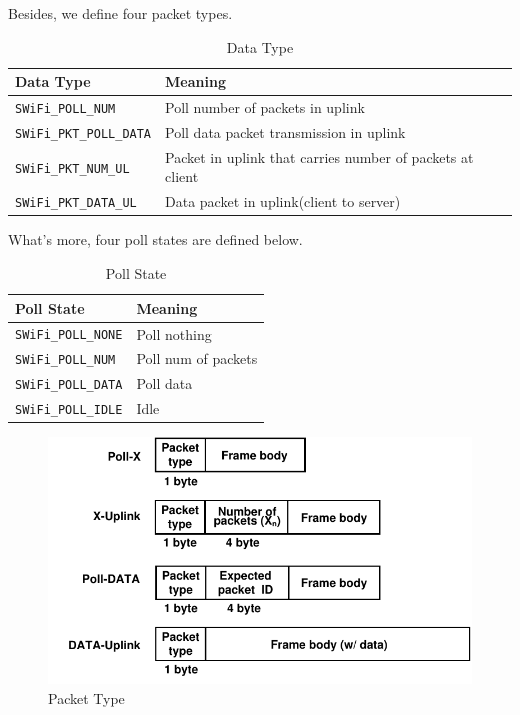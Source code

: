\documentclass{article}
\begin{document}
Besides, we define four packet types. 
\begin{table}[h!]
   \centering
   \caption{Data Type}
   \label{tab:table3}
   \begin{tabular}{| l | l |}
      \hline
      Data Type  &  Meaning\\ \hline
      \lstinline |SWiFi_POLL_NUM| & Poll number of packets in uplink\\ \hline 
      \lstinline |SWiFi_PKT_POLL_DATA|  & Poll data packet transmission in uplink\\ \hline 
      \lstinline |SWiFi_PKT_NUM_UL| & Packet in uplink that carries number of packets at client\\ \hline 
      \lstinline |SWiFi_PKT_DATA_UL| & Data packet in uplink(client to server)\\  
     \hline
   \end{tabular}
\end{table}
 
  
What's more, four poll states are defined below. 
\begin{table}[h!]
   \centering
   \caption{Poll State}
   \label{tab:table4}
   \begin{tabular}{| l | l |}
      \hline
      Poll State  &  Meaning\\ \hline
      \lstinline |SWiFi_POLL_NONE| & Poll nothing\\ \hline 
      \lstinline |SWiFi_POLL_NUM|  & Poll num of packets\\ \hline 
      \lstinline |SWiFi_POLL_DATA| & Poll data\\ \hline 
      \lstinline |SWiFi_POLL_IDLE| & Idle\\  
     \hline
   \end{tabular}
\end{table}
     
\begin{figure}[H]
\centering
\includegraphics[scale=0.6]{header.pdf}
\caption{Packet Type}
\end{figure}
\end{document}
